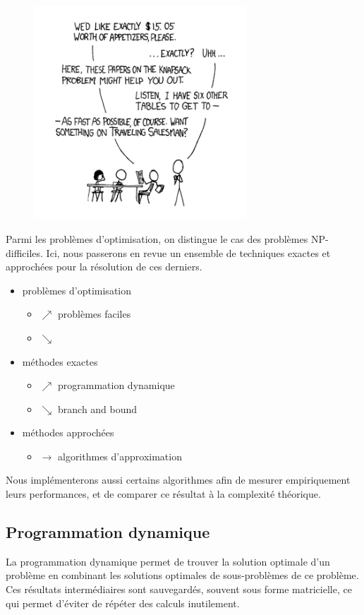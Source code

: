 \begin{figure}[h!]
\centering
\includegraphics[height = 8cm]{../images/np_complete.png}
\end{figure}

 Parmi les problèmes d'optimisation, on distingue le cas des problèmes
 NP-difficiles. Ici, nous passerons en revue un ensemble de techniques
 exactes et approchées pour la résolution de ces derniers.

\begin{itemize}
  \item problèmes d'optimisation 
  \begin{itemize}
    \item[] $\nearrow$ problèmes faciles
    \item[] $\searrow$ 
  \end{itemize}
	\item méthodes exactes 
	\begin{itemize}
		\item[] $\nearrow$ programmation dynamique
		\item[] $\searrow$ branch and bound
	\end{itemize}
	\item méthodes approchées
	\begin{itemize}
		\item[] $\longrightarrow$ algorithmes d'approximation
	\end{itemize}
\end{itemize}

Nous implémenterons aussi certains algorithmes afin de mesurer
empiriquement leurs performances, et de comparer ce résultat à la
complexité théorique.

\subsection{Programmation dynamique}
La programmation dynamique permet de trouver la solution optimale d'un
problème en combinant les solutions optimales de sous-problèmes de ce
problème. Ces résultats intermédiaires sont sauvegardés, souvent sous
forme matricielle, ce qui permet d'éviter de répéter des calculs
inutilement.

